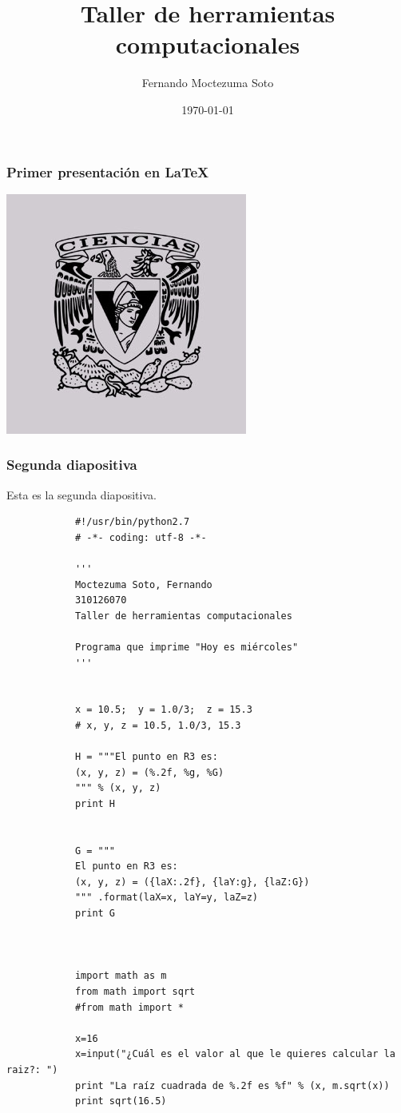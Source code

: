 \documentclass{beamer}
\title{Taller de herramientas computacionales}
\author{Fernando Moctezuma Soto}
\date{\today}
\begin{document}
	
	\maketitle
	
	
	\begin{frame}
	\transblindshorizontal
		\frametitle{Primer presentación en LaTeX}
	\end{frame}


	\begin{center}
		\includegraphics[scale=0.50]{1.jpg}
	\end{center}

	\begin{frame}
		\frametitle{Segunda diapositiva}
		Esta es la segunda diapositiva.
	\end{frame}

	\begin{frame}[fragile] %
		\begin{verbatim}
			#!/usr/bin/python2.7
			# -*- coding: utf-8 -*-
			
			'''
			Moctezuma Soto, Fernando
			310126070
			Taller de herramientas computacionales
			
			Programa que imprime "Hoy es miércoles"
			'''
			
			
			x = 10.5;  y = 1.0/3;  z = 15.3
			# x, y, z = 10.5, 1.0/3, 15.3
			
			H = """El punto en R3 es:
			(x, y, z) = (%.2f, %g, %G)
			""" % (x, y, z)
			print H
			
			
			G = """
			El punto en R3 es:
			(x, y, z) = ({laX:.2f}, {laY:g}, {laZ:G})
			""" .format(laX=x, laY=y, laZ=z)
			print G
			
			
			
			import math as m
			from math import sqrt 
			#from math import *
			
			x=16
			x=input("¿Cuál es el valor al que le quieres calcular la raiz?: ")
			print "La raíz cuadrada de %.2f es %f" % (x, m.sqrt(x))
			print sqrt(16.5)
	
		\end{verbatim}
			
	\end{frame}
\end{document}
